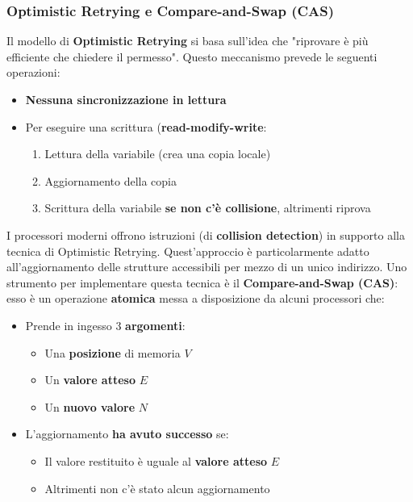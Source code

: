 \documentclass[12pt]{article}
\begin{document}
\subsubsection{Optimistic Retrying e Compare-and-Swap (CAS)}
Il modello di \textbf{Optimistic Retrying} si basa sull'idea che "riprovare è più efficiente che chiedere il permesso". Questo meccanismo prevede le seguenti operazioni:
\begin{itemize}
    \item \textbf{Nessuna sincronizzazione in lettura}
    \item Per eseguire una scrittura (\textbf{read-modify-write}:
          \begin{enumerate}
              \item Lettura della variabile (crea una copia locale)
              \item Aggiornamento della copia
              \item Scrittura della variabile \textbf{se non c'è collisione}, altrimenti riprova
          \end{enumerate}
\end{itemize}
I processori moderni offrono istruzioni (di \textbf{collision detection}) in supporto alla tecnica di Optimistic Retrying. Quest'approccio è particolarmente adatto all'aggiornamento delle strutture accessibili per mezzo di un unico indirizzo. Uno strumento per implementare questa tecnica è il \textbf{Compare-and-Swap (CAS)}: esso è un operazione \textbf{atomica} messa a disposizione da alcuni processori che:
\begin{itemize}
    \item Prende in ingesso 3 \textbf{argomenti}:
          \begin{itemize}
              \item Una \textbf{posizione} di memoria $V$
              \item Un \textbf{valore atteso} $E$
              \item Un \textbf{nuovo valore} $N$
          \end{itemize}
    \item L'aggiornamento \textbf{ha avuto successo} se:
          \begin{itemize}
              \item Il valore restituito è uguale al \textbf{valore atteso} $E$
              \item Altrimenti non c'è stato alcun aggiornamento
          \end{itemize}
\end{itemize}
\end{document}
